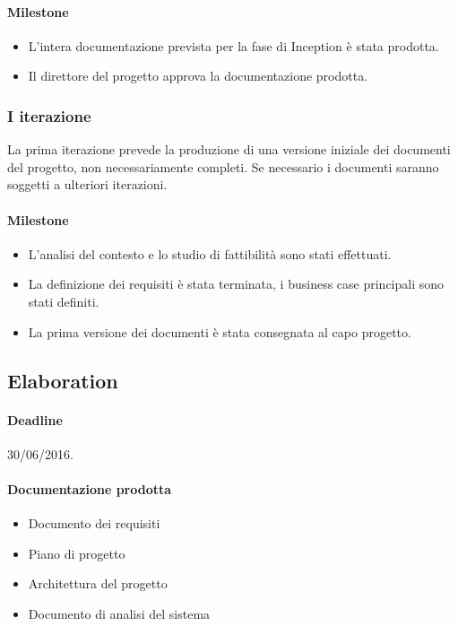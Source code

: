 \paragraph{Milestone}
\begin{itemize}
	\item L'intera documentazione prevista per la fase di Inception \`e stata prodotta.
	\item Il direttore del progetto approva la documentazione prodotta.
\end{itemize}

\subsubsection{I iterazione}

La prima iterazione prevede la produzione di una versione iniziale dei documenti del progetto, non necessariamente completi.
Se necessario i documenti saranno soggetti a ulteriori iterazioni.

\paragraph{Milestone}
\begin{itemize}
	\item L'analisi del contesto e lo studio di fattibilit\`a sono stati effettuati.
	\item La definizione dei requisiti \`e stata terminata, i business case principali sono stati definiti.
	\item La prima versione dei documenti \`e stata consegnata al capo progetto.
\end{itemize}

\subsection{Elaboration}

\paragraph{Deadline}
30/06/2016.

\paragraph{Documentazione prodotta}
\begin{itemize}
	\item Documento dei requisiti
	\item Piano di progetto
	\item Architettura del progetto
	\item Documento di analisi del sistema
\end{itemize}

